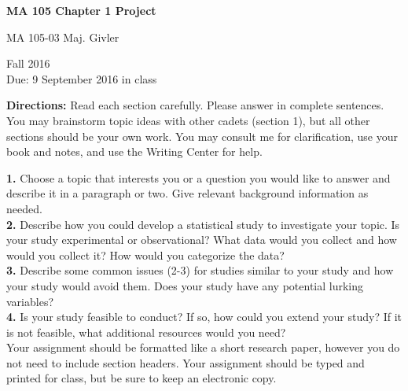 \documentclass[fleqn, letterpaper]{article}
\begin{document}
\noindent




\begin{center}\textbf{MA 105 Chapter 1 Project}\end{center}

\noindent
\begin{bf}MA 105-03 Maj. Givler

\noindent
Fall 2016\\
Due: 9 September 2016 in class
\end{bf}

\vspace{1 cm}
\noindent
{\bfseries Directions:} Read each section carefully. Please answer in complete sentences. You may brainstorm topic ideas with other cadets (section 1), but all other sections should be your own work. You may consult me for clarification, use your book and notes, and use the Writing Center for help. 

\vspace{.5 cm}
\noindent
{\bfseries 1.} Choose a topic that interests you or a question you would like to answer and describe it in a paragraph or two. Give relevant background information as needed.\\

\noindent
{\bfseries 2.} Describe how you could develop a statistical study to investigate your topic. Is your study experimental or observational? What data would you collect and how would you collect it? How would you categorize the data?\\

\noindent
{\bfseries 3.} Describe some common issues (2-3) for studies similar to your study and how your study would avoid them. Does your study have any potential lurking variables?\\

\noindent
{\bfseries 4.} Is your study feasible to conduct? If so, how could you extend your study? If it is not feasible, what additional resources would you need?\\


Your assignment should be formatted like a short research paper, however you do not need to include section headers. Your assignment should be typed and printed for class, but be sure to keep an electronic copy.
\end{document}
